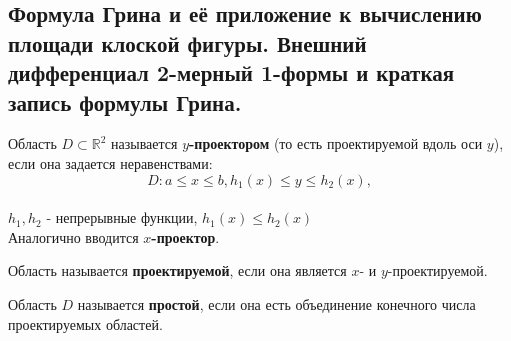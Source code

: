 \subsection{Формула Грина и её приложение к вычислению площади клоской фигуры. Внешний дифференциал 2-мерный 1-формы и краткая запись формулы Грина.}
    \begin{definition*}
        Область $D \subset \mathbb{R}^2$ называется \textbf{$y$-проектором} (то есть проектируемой вдоль оси $y$), если она задается неравенствами:\\
        $$D:  a \leq x \leq b, h_1\left(x\right)\leq y \leq h_2\left(x\right),$$\\
        $h_1, h_2$ - непрерывные функции, $h_1\left(x\right) \leq h_2\left(x\right)$\\
        Аналогично вводится \textbf{$x$-проектор}.\\
    \end{definition*}
    \begin{definition*}
        Область называется \textbf{проектируемой}, если она является $x$- и $y$-проектируемой.\\
    \end{definition*}
    \begin{definition*}
        Область $D$ называется \textbf{простой}, если она есть объединение конечного числа проектируемых областей.\\
    \end{definition*}
